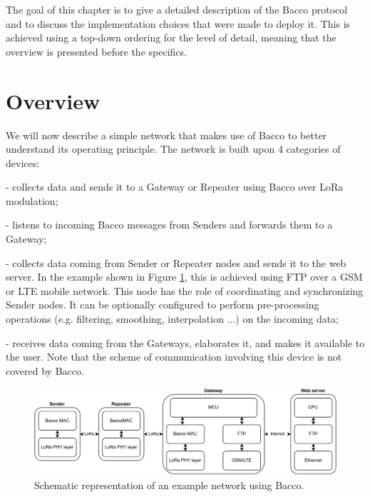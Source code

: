 The goal of this chapter is to give a detailed description of the Bacco protocol and to discuss the
implementation choices that were made to deploy it. This is achieved using a top-down ordering for the level
of detail, meaning that the overview is presented before the specifics.

\section{Overview}
We will now describe a simple network that makes use of Bacco to better understand its operating principle. The
network is built upon 4 categories of devices:

\begin{description}[font=$\bullet$~\normalfont\scshape\color{blue!50!black}]
    \item [Sender node] - collects data and sends it to a Gateway or Repeater using Bacco over LoRa modulation;
    \item [Repeater node] - listens to incoming Bacco messages from Senders and forwards them to a Gateway;
    \item [Gateway node] - collects data coming from Sender or Repeater nodes and sends it to the web server. In the example
        shown in Figure \ref{img: network stack}, this is achieved using \gls{FTP} over a \gls{GSM} or \gls{LTE} mobile
        network. This node has the role of coordinating and synchronizing Sender nodes. It can be optionally configured
        to perform pre-processing operations (e.g. filtering, smoothing, interpolation ...) on the incoming data;
    \item [Web server] - receives data coming from the Gateways, elaborates it, and makes it available to the user. Note
        that the scheme of communication involving this device is not covered by Bacco.
\end{description}

\begin{figure}[ht]
    \centering
    \includegraphics[width=1.0\textwidth]{uml/network_stack.pdf}
    \caption{Schematic representation of an example network using Bacco.}
    \label{img: network stack}
\end{figure}

